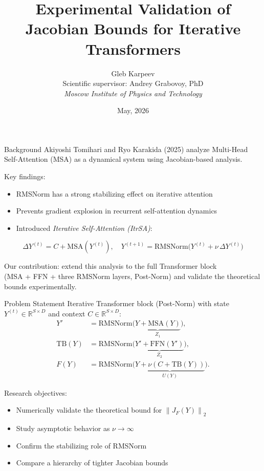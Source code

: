 \documentclass{beamer}
\title{Experimental Validation of Jacobian Bounds for Iterative Transformers}
\author{
    Gleb Karpeev \\
    Scientific supervisor: Andrey Grabovoy, PhD \\
    \textit{Moscow Institute of Physics and Technology}
}
\date{May, 2026}
\newcommand{\norm}[1]{\left\|#1\right\|}
\newcommand{\RMSNorm}{\mathrm{RMSNorm}}
\newcommand{\TB}{\mathrm{TB}}
\newcommand{\MSA}{\mathrm{MSA}}
\newcommand{\FFN}{\mathrm{FFN}}
\begin{document}
\begin{frame}
    \titlepage
\end{frame}

\begin{frame}{Background}
    Akiyoshi Tomihari and Ryo Karakida (2025) analyze Multi-Head Self-Attention (MSA) as a dynamical system using Jacobian-based analysis.

    \vspace{0.5em}
    Key findings:
    \begin{itemize}
        \item RMSNorm has a strong stabilizing effect on iterative attention
        \item Prevents gradient explosion in recurrent self-attention dynamics
        \item Introduced \textit{Iterative Self-Attention (ItrSA)}:
    \end{itemize}

    \begin{equation*}
        \Delta Y^{(t)} = C + \MSA(Y^{(t)}), \quad
        Y^{(t+1)} = \RMSNorm\bigl(Y^{(t)} + \nu\,\Delta Y^{(t)}\bigr)
    \end{equation*}

    \vspace{0.5em}
    Our contribution: extend this analysis to the full Transformer block \\
    (MSA + FFN + three RMSNorm layers, Post-Norm) and validate the
    theoretical bounds experimentally.
\end{frame}

\begin{frame}{Problem Statement}
    Iterative Transformer block (Post-Norm) with state $Y^{(t)} \in \mathbb{R}^{S \times D}$
    and context $C \in \mathbb{R}^{S \times D}$:
    \begin{align*}
        Y' &= \RMSNorm\bigl(\underbrace{Y + \MSA(Y)}_{Z_1}\bigr), \\
        \TB(Y) &= \RMSNorm\bigl(\underbrace{Y' + \FFN(Y')}_{Z_2}\bigr), \\
        F(Y) &= \RMSNorm\bigl(\underbrace{Y + \nu(C + \TB(Y))}_{U(Y)}\bigr).
    \end{align*}

    \vspace{0.3em}
    Research objectives:
    \begin{itemize}
        \item Numerically validate the theoretical bound for $\norm{J_F(Y)}_2$
        \item Study asymptotic behavior as $\nu \to \infty$
        \item Confirm the stabilizing role of RMSNorm
        \item Compare a hierarchy of tighter Jacobian bounds
    \end{itemize}
\end{frame}
\end{document}

